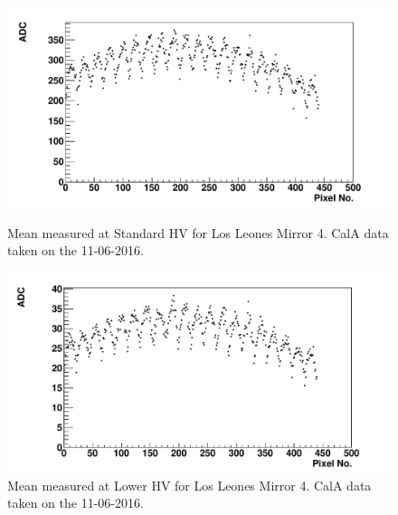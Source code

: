 \begin{figure} %
\includegraphics[width=\textwidth]{chapters/graphs/GainVarsMeas/LL_m04_2016-06-11/Set0and2/meanHist_StandHV_Pairs_set0and2.pdf}
\caption{Mean measured at Standard HV for Los Leones Mirror 4. CalA data taken on the 11-06-2016.}
\vspace{3mm}
\includegraphics[width=\textwidth]{chapters/graphs/GainVarsMeas/LL_m04_2016-06-11/Set0and2/meanHist_LowHV_Pairs_set0and2.pdf}
\caption{Mean measured at Lower HV for Los Leones Mirror 4. CalA data taken on the 11-06-2016.} \label{fig:CalAMeanADC_Pairs}
\end{figure}

